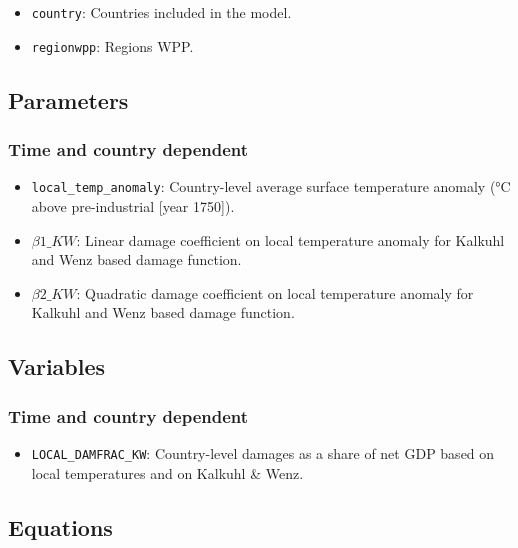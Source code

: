 \documentclass[
]{article}
\providecommand{\tightlist}{%
  \setlength{\itemsep}{0pt}\setlength{\parskip}{0pt}}
\begin{document}
\begin{itemize}
\tightlist
\item
  \texttt{country}: Countries included in the model.
\item
  \texttt{regionwpp}: Regions WPP.
\end{itemize}

\subsection{Parameters}\label{parameters-1}


\subsubsection{Time and country
dependent}\label{time-and-country-dependent-2}

\begin{itemize}
\tightlist
\item
  \texttt{local\_temp\_anomaly}: Country-level average surface
  temperature anomaly (°C above pre-industrial {[}year 1750{]}).
\item
  \(\beta1\_{KW}\): Linear damage coefficient on local temperature
  anomaly for Kalkuhl and Wenz based damage function.
\item
  \(\beta2\_{KW}\): Quadratic damage coefficient on local temperature
  anomaly for Kalkuhl and Wenz based damage function.
\end{itemize}

\subsection{Variables}\label{variables-1}

\subsubsection{Time and country
dependent}\label{time-and-country-dependent-3}

\begin{itemize}
\tightlist
\item
  \texttt{LOCAL\_DAMFRAC\_KW}: Country-level damages as a share of net
  GDP based on local temperatures and on Kalkuhl \& Wenz.

\end{itemize}

\subsection{Equations}\label{equations-1}
\end{document}
